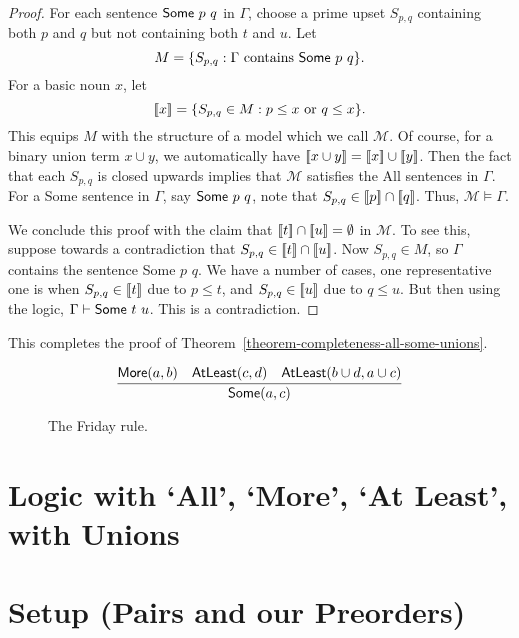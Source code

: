 \documentclass[12pt]{article}
\theoremstyle{definition}
\newcommand{\semantics}[1]{[\![\mbox{\em $ #1 $\/}]\!]}
\newcommand{\Model}{\mathcal{M}}
\newcommand{\set}[1]{\{ #1 \}}
\newcommand{\proves}{\vdash}
\newlength{\mathfrwidth}
\newenvironment{mathframe}
    {\begin{lrbox}{\mathfrbox}\begin{minipage}{\mathfrwidth}\begin{center}}
    {\end{center}\end{minipage}\end{lrbox}\noindent\fbox{\usebox{\mathfrbox}}}
\begin{document}
 \begin{proof}
 For each sentence $\mbox{\sf Some $p$ $q$}$ in $\Gamma$,
 choose a prime upset $S_{p,q}$ containing both $p$ and $q$
 but not containing both $t$ and $u$.
 Let 
 \[ M = \set{S_{p,q}: \Gamma \mbox{ contains \mbox{\sf Some $p$ $q$}}}.\]
 For a basic noun $x$, let 
 \[\semantics{x} = \set{S_{p,q}
\in M: p\leq x \mbox{ or } q \leq x}.\]
 This equips $M$ with the structure of a model which we call $\Model$.
 Of course, for a binary union term $x\cup y$, 
 we automatically have $\semantics{x\cup y} = \semantics{x} \cup\semantics{y}$.
 Then the fact that each $S_{p,q}$ is closed upwards implies that $\Model$
satisfies the {\sf All} sentences in $\Gamma$.
For a {\sf Some} sentence in $\Gamma$, say $\mbox{\sf Some $p$ $q$}$,
note that $S_{p,q}\in \semantics{p}\cap\semantics{q}$.  
Thus, $\Model\models\Gamma$.   

We conclude this proof with the claim that $\semantics{t}\cap\semantics{u} = \emptyset$
in $\Model$.   To see this, suppose towards a contradiction that $S_{p,q} \in\semantics{t}\cap\semantics{u} $.
Now $S_{p,q}\in M$, so $\Gamma$ contains
the sentence {\sf Some $p$ $q$}.
We have a number of cases, one representative one is when
$S_{p,q} \in\semantics{t}$ due to $p \leq t$,
and $S_{p,q} \in\semantics{u}$ due to $q \leq u$.
But then using the logic, $\Gamma\proves\mbox{\sf Some $t$ $u$}$.
This is a contradiction.
 \end{proof}
 
This completes the proof of Theorem~\ref{theorem-completeness-all-some-unions}. 
      
      
 \begin{figure}[t]
\begin{mathframe}
 \[
 \infer{\mbox{\sf Some} (a, c)}{\mbox{\sf More}(a,b) & \mbox{\sf AtLeast}(c,d) & \mbox{\sf{AtLeast}}(b \cup d, a \cup c)}
\] 
\caption{The Friday rule.\label{fig-friday}}
\end{mathframe}
\end{figure}

\section{Logic with `All', `More', `At Least', with Unions}


\section{Setup (Pairs and our Preorders)}
\end{document}
